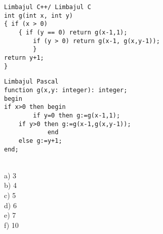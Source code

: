 \begin{verbatim}
Limbajul C++/ Limbajul C
int g(int x, int y)
{ if (x > 0)
    { if (y == 0) return g(x-1,1);
        if (y > 0) return g(x-1, g(x,y-1));
        }
return y+1;
}
\end{verbatim}
\begin{verbatim}
Limbajul Pascal
function g(x,y: integer): integer;
begin
if x>0 then begin
        if y=0 then g:=g(x-1,1);
    if y>0 then g:=g(x-1,g(x,y-1));
            end
    else g:=y+1;
end;
\end{verbatim}
\\
a) 3
\\
b) 4
\\
c) 5
\\
d) 6
\\
e) 7
\\
f) 10
\\